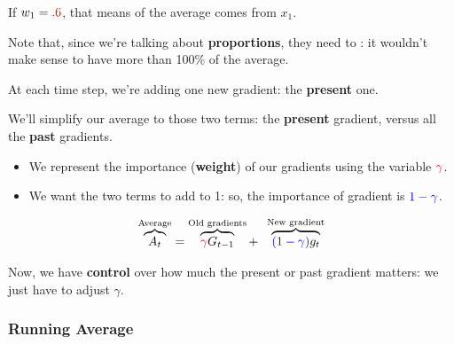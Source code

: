             
            \miniex If $w_1=\textcolor{red}{.6}$, that means  of the average comes from $x_1$.
            
            Note that, since we're talking about \textbf{proportions}, they need to : it wouldn't make sense to have more than 100\% of the average.
            
            At each time step, we're adding one new gradient: the \textbf{present} one.
            
            We'll simplify our average to those two terms: the \textbf{present} gradient, versus all the \textbf{past} gradients.
            
            \begin{itemize}
                \item We represent the importance (\textbf{weight}) of our  gradients using the variable $\textcolor{red}{\gamma}$.
                
                \item We want the two terms to add to 1: so, the importance of  gradient is $\textcolor{blue}{1-\gamma}$.
            \end{itemize}
            
            \begin{equation}
                \overbrace{
                    A_t 
                }^{\text{Average}}
                =
                \overbrace{
                    \textcolor{red}{\gamma} G_{t-1}
                }^{\text{Old gradients}}
                + \;\;
                \overbrace{
                    \textcolor{blue}{(1-\gamma)} g_{t}
                }^{\text{New gradient}}
            \end{equation}
            
            Now, we have \textbf{control} over how much the present or past gradient matters: we just have to adjust $\gamma$. 
            
        \subsecdiv
        
        \subsubsection{Running Average}
        
